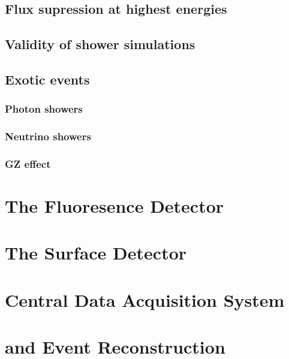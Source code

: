 \subsection{Flux supression at highest energies}
\subsection{Validity of shower simulations}
\subsection{Exotic events}
\subsubsection{Photon showers}
\subsubsection{Neutrino showers}
\subsubsection{GZ effect}

\section{The Fluoresence Detector}
\label{sec:fd}



\section{The Surface Detector}
\label{sec:sd}



\section{Central Data Acquisition System}
\label{sec:cdas}



\section{\Offline and Event Reconstruction}
\label{sec:rec}

